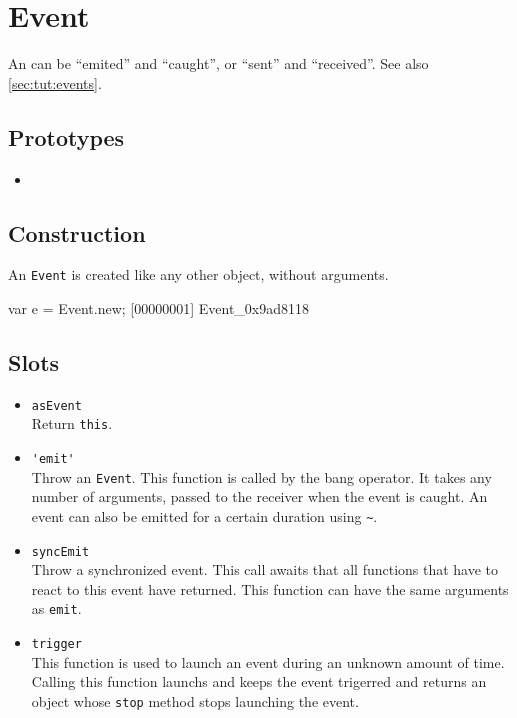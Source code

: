 \section{Event}

An  can be ``emited'' and ``caught'', or ``sent'' and
``received''.  See also \autoref{sec:tut:events}.

\subsection{Prototypes}
\begin{itemize}
\item {}
\end{itemize}

\subsection{Construction}

An \lstinline{Event} is created like any other object, without
arguments.

\begin{urbiscript}
var e = Event.new;
[00000001] Event_0x9ad8118
\end{urbiscript}

\subsection{Slots}
\begin{itemize}
\item \lstinline|asEvent|\\
  Return \lstinline|this|.

\item \lstinline|'emit'|\\
  Throw an \lstinline|Event|. This function is called by the bang
  operator.  It takes any number of arguments, passed to the receiver
  when the event is caught. An event can also be emitted for a certain
  duration using \lstinline|~|.

\item \lstinline|syncEmit|\\
  Throw a synchronized event. This call awaits that all functions that
  have to react to this event have returned.  This function can have
  the same arguments as \lstinline|emit|.

\item \lstinline|trigger|\\
  This function is used to launch an event during an unknown amount of
  time. Calling this function launchs and keeps the event trigerred
  and returns an object whose \lstinline|stop| method stops launching
  the event.
\end{itemize}


